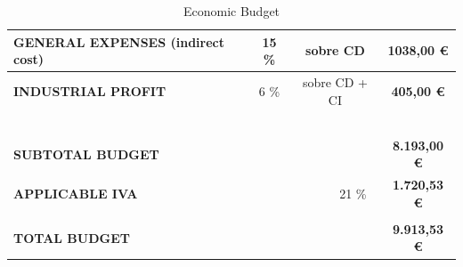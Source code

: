 \begin{table}[H]
{\begin{tabular}{lllllc}
\multicolumn{1}{|l|}{\textbf{GENERAL EXPENSES (indirect cost)}} & 
\multicolumn{1}{c|}{15 \%} & 
\multicolumn{3}{c|}{sobre CD} & 
\multicolumn{1}{c|}{\textbf{1038,00 \euro}} \\ 
\hline

\multicolumn{1}{|l|}{\textbf{INDUSTRIAL PROFIT}} & 
\multicolumn{1}{c|}{6 \%} & 
\multicolumn{3}{c|}{sobre CD + CI} &
\multicolumn{1}{c|}{\textbf{405,00 \euro}} \\ 
\hline

& & & & & 
\multicolumn{1}{l}{} \\

\multicolumn{6}{l}{\textbf{}} \\


\multicolumn{5}{l}{} & 
\multicolumn{1}{c}{} \\ 

\multicolumn{5}{l}{} & 
\multicolumn{1}{c}{} \\ 

& & & & & 
\multicolumn{1}{l}{} \\
\hline

\multicolumn{5}{|l|}{\textbf{SUBTOTAL BUDGET}} & 
\multicolumn{1}{c|}{\textbf{8.193,00 \euro}} \\ 
\hline

\multicolumn{4}{|l|}{\textbf{APPLICABLE IVA}} & 
\multicolumn{1}{c|}{21 \%} & 
\multicolumn{1}{c|}{\textbf{1.720,53 \euro}} \\ 
\hline

& & & & &
\multicolumn{1}{l}{} \\ 
\hline

\multicolumn{5}{|l|}{\textbf{TOTAL BUDGET}} & 
\multicolumn{1}{c|}{\textbf{9.913,53 \euro}} \\ 
\hline

\end{tabular}}
    \caption{Economic Budget}
    \label{economic-budget}
    
\end{table}